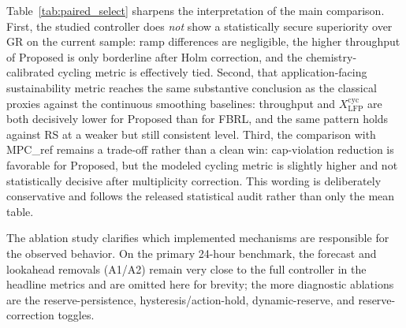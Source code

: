 \documentclass[preprint,12pt]{elsarticle}
\def\texttt#1{#1}%
\begin{document}
Table~\ref{tab:paired_select} sharpens the interpretation of the main comparison. First, the studied controller does \emph{not} show a statistically secure superiority over GR on the current sample: ramp differences are negligible, the higher throughput of Proposed is only borderline after Holm correction, and the chemistry-calibrated cycling metric is effectively tied. Second, that application-facing sustainability metric reaches the same substantive conclusion as the classical proxies against the continuous smoothing baselines: throughput and $X_{\mathrm{LFP}}^{\mathrm{cyc}}$ are both decisively lower for Proposed than for FBRL, and the same pattern holds against RS at a weaker but still consistent level. Third, the comparison with \texttt{MPC\_ref} remains a trade-off rather than a clean win: cap-violation reduction is favorable for Proposed, but the modeled cycling metric is slightly higher and not statistically decisive after multiplicity correction. This wording is deliberately conservative and follows the released statistical audit rather than only the mean table.

The ablation study clarifies which implemented mechanisms are responsible for the observed behavior. On the primary 24-hour benchmark, the forecast and lookahead removals (A1/A2) remain very close to the full controller in the headline metrics and are omitted here for brevity; the more diagnostic ablations are the reserve-persistence, hysteresis/action-hold, dynamic-reserve, and reserve-correction toggles.

\begin{table}[H]
\centering
\caption{Key ablation means on the 24-hour primary benchmark (eight scenario-day units).}
\label{tab:ablation_focus}
\footnotesize
\setlength{\tabcolsep}{3pt}
\end{table}
\end{document}
